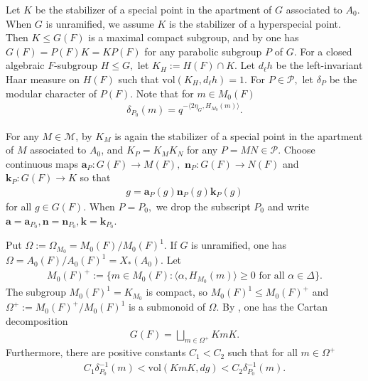 \documentclass[10pt]{amsart}
\theoremstyle{definition}
\numberwithin{equation}{section}
\numberwithin{equation}{subsection}
\begin{document}
Let $K$ be the stabilizer of a special point in the apartment of $G$ associated to $A_0$.  When $G$ is unramified, we assume $K$ is the stabilizer of a hyperspecial point.  Then $K\leq G(F)$ is a maximal compact subgroup, and by \cite[Theorem 5.3.4]{KP:BruhatTits} one has $G(F) = P(F)K = KP(F)$ for any parabolic subgroup $P$ of $G$. For a closed algebraic $F$-subgroup $H\le G,$ let $K_H:=H(F)\cap K.$  Let $d_\ell h$ be the left-invariant Haar measure on $H(F)$ such that $\mathrm{vol}(K_H,d_\ell h)=1$. For $P\in \mathcal{P},$ let $\delta_P$ be the modular character of $P(F)$. Note that for $m\in M_0(F)$
\begin{align*}
    \delta_{P_0}(m)=q^{-\langle 2\eta_G,H_{M_0}(m)\rangle}.
\end{align*}


For any $M\in \mathcal{M}$, by \cite[\S 6.7.2 and Corollary 9.7.3]{KP:BruhatTits} $K_M $ is again the stabilizer of a special point in the apartment of $M$ associated to $A_0$, and $K_P = K_MK_N$ for any $P=MN\in \mathcal{P}$. Choose continuous maps $\mathbf{a}_P:G(F)\to M(F),$ $\mathbf{n}_P:G(F)\to N(F)$ and $\mathbf{k}_P:G(F)\to K$ so that
\begin{align*}
    g = \textbf{a}_P(g)\mathbf{n}_P(g)\textbf{k}_P(g)
\end{align*}
for all $g\in G(F)$. When $P=P_0,$ we drop the subscript $P_0$ and write $\mathbf{a}=\mathbf{a}_{P_0},\mathbf{n}=\mathbf{n}_{P_0},\mathbf{k}=\mathbf{k}_{P_0}.$

 
Put $\Omega:=\Omega_{M_0}=M_0(F)/M_0(F)^1.$ If $G$ is unramified, one has $\Omega=A_0(F)/A_0(F)^1=X_*(A_0)$. Let
\begin{align*}
    M_0(F)^+ := \{m\in M_0(F) : \langle \alpha,H_{M_0}(m)\rangle\ge 0 \text{ for all }\alpha\in\Delta\}.
\end{align*}
The subgroup $M_0(F)^1 = K_{M_0}$ is compact, so $M_0(F)^1\le M_0(F)^+$ and $\Omega^{+} := M_0(F)^+ / M_0(F)^1$ is a submonoid of $\Omega$.  By \cite[Theorem 5.2.1]{KP:BruhatTits}, one has the Cartan decomposition
\begin{align}\label{decomp:group:Cartan}
    G(F) = \bigsqcup_{m\in \Omega^+} KmK.
\end{align}
Furthermore, there are positive constants $C_1<C_2$ such that for all $m\in \Omega^+$
\begin{align}\label{Cartan:measure}
    C_1\delta_{P_0}^{-1}(m)<\mathrm{vol}(KmK,dg)<C_2\delta_{P_0}^{-1}(m).
\end{align}
\end{document}
